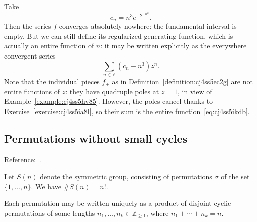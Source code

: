 \documentclass[reqno]{amsart}  \numberwithin{theorem}{section} \numberwithin{equation}{section}
\begin{document}
\begin{example}
  Take
  \begin{equation*}
    c_n = n^3 e^{- 2^{- n^2 }}.
  \end{equation*}
  Then the series $f$ converges absolutely nowhere: the fundamental interval is empty.  But we can still define its regularized generating function, which is actually an entire function of $n$: it may be written explicitly as the everywhere convergent series
  \begin{equation}\label{eq:cj4ss5ikdb}
\sum_{n \in \mathbb{Z} } (c_n - n^3) z^n.
\end{equation}
Note that the individual pieces $f_{\pm}$ as in Definition~\ref{definition:cj4ss5ec2g} are not entire functions of $z$: they have quadruple poles at $z=1$, in view of Example~\ref{example:cj4ss5hv85}.  However, the poles cancel thanks to Exercise~\ref{exercise:cj4ss5ia8l}, so their sum is the entire function~\eqref{eq:cj4ss5ikdb}.
\end{example}


\subsection{Permutations without small cycles}\label{sec:cj4unj04kx}
Reference:~\cite[p176]{MR2172781}.

Let $S(n)$ denote the symmetric group, consisting of permutations $\sigma$ of the set $ \{1, \dotsc, n\}$.  We have $\# S(n) = n!$.

Each permutation may be written uniquely as a product of disjoint cyclic permutations of some lengths $n_1, \dotsc, n_k \in \mathbb{Z}_{\geq 1}$, where $n_1 + \dotsb + n_k = n$.
\end{document}
